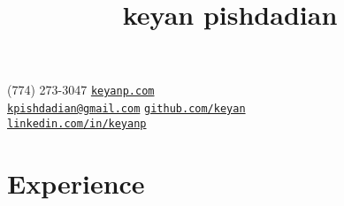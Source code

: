 \documentclass[letterpaper,hidelinks]{scrartcl}
\begin{document}
\title{keyan pishdadian}

(774) 273-3047 \hfill \href{https://keyanp.com}{\texttt{keyanp.com}} \\
\href{mailto:kpishdadian@gmail.com}{\texttt{kpishdadian@gmail.com}} \hfill \href{https://github.com/keyan}{\texttt{github.com/keyan}} \\
\null \hfill \href{https://linkedin.com/in/keyanp}{\texttt{linkedin.com/in/keyanp}}

%
%


%
%

\section*{Experience}
\end{document}

